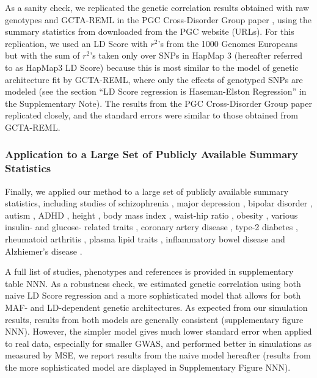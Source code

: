 \documentclass[11pt]{article}
\numberwithin{equation}{section}
\begin{document}
As a sanity check, we replicated the genetic correlation results obtained with
raw genotypes and GCTA-REML in
the PGC Cross-Disorder Group paper \cite{pgccdg2013}, 
using the summary statistics from \cite{cross2013identification} downloaded from the PGC website (URLs).
For this replication, we used an LD Score with $r^2$'s from the 1000 Genomes Europeans \cite{10002012integrated}
but with the sum of $r^2$'s taken only over SNPs in HapMap 3 \cite{international2010integrating} 
(hereafter referred to as HapMap3 LD Score)
because this is most similar to the model of genetic architecture fit by GCTA-REML,
where only the effects of genotyped SNPs are modeled
(see the section ``LD Score regression is Haseman-Elston Regression'' in the Supplementary Note). 
The results from the PGC Cross-Disorder Group paper replicated closely, 
and the standard errors were similar to those obtained from GCTA-REML.



\subsubsection{Application to a Large Set of Publicly Available Summary Statistics}
Finally, we applied our method to a large set of publicly available summary statistics, 
including studies of 
schizophrenia \cite{schizophrenia2014biological}, 
major depression \cite{ripke2012mega}, 
bipolar disorder \cite{sklar2011large}, 
autism \cite{cross2013identification},
ADHD \cite{neale2010meta},
height \cite{allen2010hundreds}, 
body mass index \cite{speliotes2010association}, 
waist-hip ratio \cite{heid2010meta}, 
obesity \cite{berndt2013genome}, 
various insulin- and glucose- related traits
\cite{prokopenko2014central,scott2012large,manning2012genome,strawbridge2011genome,saxena2010genetic,dupuis2010new,soranzo2010common},
coronary artery disease \cite{schunkert2011large}, 
type-2 diabetes \cite{morris2012large}, 
rheumatoid arthritis \cite{stahl2010genome}, 
plasma lipid traits \cite{teslovich2010biological},
inflammatory bowel disease \cite{jostins2012host} and 
Alzhiemer's disease \cite{lambert2013meta}.

A full list of studies, phenotypes and references is provided in supplementary table NNN.
As a robustness check, we estimated genetic correlation using both naive LD Score regression
and a more sophisticated model that allows for both MAF- and LD-dependent genetic architectures.
As expected from our simulation results, results from both models are generally consistent (supplementary figure NNN). 
However, the simpler model gives much lower standard error when applied to real data, especially for smaller GWAS, 
and performed better in simulations as measured by MSE,
we report results from the naive model hereafter (results from the more sophisticated model are displayed in Supplementary Figure NNN).
\end{document}
